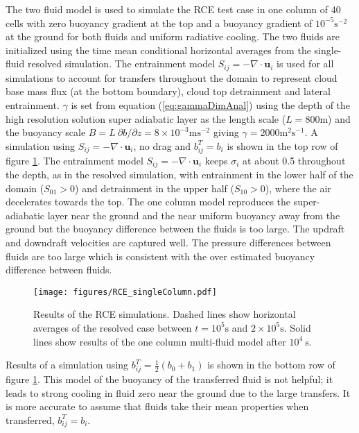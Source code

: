 \documentclass[draft]{agujournal2019}
\begin{document}
The two fluid model is used to simulate the RCE test case in one
column of 40 cells with zero buoyancy gradient at the top and a buoyancy
gradient of $10^{-5}\text{s}^{-2}$ at the ground for both fluids
and uniform radiative cooling. The two fluids are initialized using
the time mean conditional horizontal averages from the single-fluid
resolved simulation. The entrainment model $S_{ij}=-\nabla\cdot\mathbf{u}_{i}$
is used for all simulations to account for transfers throughout the
domain to represent cloud base mass flux (at the bottom boundary),
cloud top detrainment and lateral entrainment. $\gamma$ is set from
equation (\ref{eq:gammaDimAnal}) using the depth of the high resolution solution super adiabatic
layer as the length scale ($L=800\text{m}$) and the buoyancy scale
$B=L\ \partial b/\partial z=8\times10^{-3}\text{m}\text{s}^{-2}$
giving $\gamma=2000\text{m}^{2}\text{s}^{-1}$. A simulation using
$S_{ij}=-\nabla\cdot\mathbf{u}_{i}$, no drag and $b_{ij}^{T}=b_{i}$
is shown in the top row of figure \ref{fig:RCE_singleColumn}.
The entrainment model $S_{ij}=-\nabla\cdot\mathbf{u}_{i}$ keeps $\sigma_{i}$
at about 0.5 throughout the depth, as in the resolved simulation,
with entrainment in the lower half of the domain ($S_{01}>0$) and
detrainment in the upper half ($S_{10}>0$), where the air decelerates
towards the top. The one column model reproduces the super-adiabatic
layer near the ground and the near uniform buoyancy away from the
ground but the buoyancy difference between the fluids is too large.
The updraft and downdraft velocities are captured well. The pressure
differences between fluids are too large which is consistent with
the over estimated buoyancy difference between fluids. 

\begin{figure}
\noindent
\texttt{[image: figures/RCE\_singleColumn.pdf]}
\caption{\label{fig:RCE_singleColumn}
Results of the RCE simulations. Dashed lines show horizontal averages
of the resolved case between $t=10^{5}\text{s}$ and $2\times10^{5}\text{s}$. Solid lines show results of the one column multi-fluid model after $10^{4}\ \text{s}$. }
\end{figure}

Results of a simulation using $b_{ij}^{T}=\frac{1}{2}(b_{0}+b_{1})$
is shown in the bottom row of figure \ref{fig:RCE_singleColumn}.
This model of the buoyancy of the transferred fluid is not helpful; it leads
to strong cooling in fluid zero near the ground due to the large transfers.
It is more accurate to assume that fluids take their mean properties
when transferred, $b_{ij}^{T}=b_{i}$. 
\end{document}
